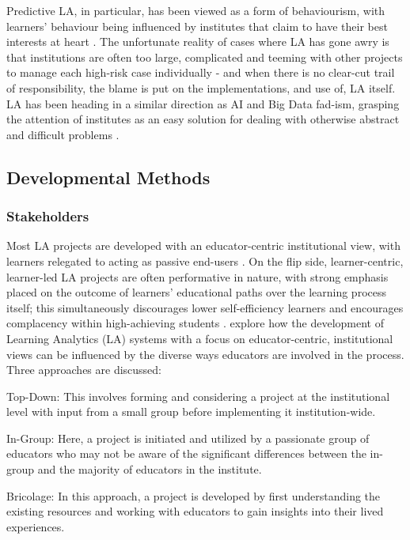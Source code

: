 \documentclass{l4proj}
\begin{document}
Predictive LA, in particular, has been viewed as a form of behaviourism, with learners' behaviour being influenced by institutes that claim to have their best interests at heart \citep{Yen-TingLiuLearningPoint}. The unfortunate reality of cases where LA has gone awry is that institutions are often too large, complicated and teeming with other projects to manage each high-risk case individually - and when there is no clear-cut trail of responsibility, the blame is put on the implementations, and use of, LA itself. LA has been heading in a similar direction as AI and Big Data fad-ism, grasping the attention of institutes as an easy solution for dealing with otherwise abstract and difficult problems \citep{BeerThreeAustralia}. 


\subsection{Developmental Methods}
\subsubsection{Stakeholders}
\hfill

Most LA projects are developed with an educator-centric institutional view, with learners relegated to acting as passive end-users \citep{Joseph-Richard2023WhichPerspective}. On the flip side, learner-centric, learner-led LA projects are often performative in nature, with strong emphasis placed on the outcome of learners' educational paths over the learning process itself; this simultaneously discourages lower self-efficiency learners and encourages complacency within high-achieving students \citep{Yen-TingLiuLearningPoint}. \citet{BeerThreeAustralia} explore how the development of Learning Analytics (LA) systems with a focus on educator-centric, institutional views can be influenced by the diverse ways educators are involved in the process. Three approaches are discussed:

Top-Down: This involves forming and considering a project at the institutional level with input from a small group before implementing it institution-wide.

In-Group: Here, a project is initiated and utilized by a passionate group of educators who may not be aware of the significant differences between the in-group and the majority of educators in the institute. 

Bricolage: In this approach, a project is developed by first understanding the existing resources and working with educators to gain insights into their lived experiences. 
\end{document}
